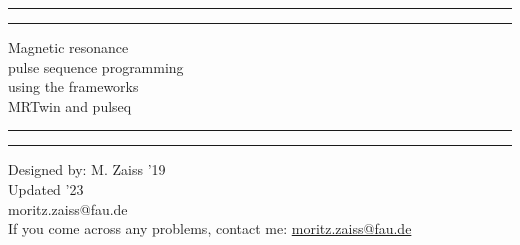 \documentclass[a4paper,12pt]{extarticle}
\begin{document}

\graphicspath{ {./img/} }
\begin{titlepage}
	\centering %
	\scshape %
	\vspace*{1.5\baselineskip} %

	\rule{13cm}{1.6pt}\vspace*{-\baselineskip}\vspace*{2pt} %
	\rule{13cm}{0.4pt} %
	
		\vspace{0.75\baselineskip} %
		{\Huge Magnetic resonance  \\ 
			\vspace{4mm}
            pulse sequence programming \\
            \vspace{4mm}
	         using the frameworks \\ MRTwin and pulseq \\	
        }
		\vspace{0.75\baselineskip} %
	\rule{13cm}{0.4pt}\vspace*{-\baselineskip}\vspace{3.2pt} %
	\rule{13cm}{1.6pt} %
	
		\vspace{1.75\baselineskip} %
	{\large Designed by: M. Zaiss '19 \\
	Updated '23 \\
		\vspace*{1.2\baselineskip}
	moritz.zaiss@fau.de} \\
	\vfill
If you come across any problems, contact me: \url{moritz.zaiss@fau.de}\\ \vspace{1mm}
\end{titlepage}
\tableofcontents
\vfill
\end{document}
